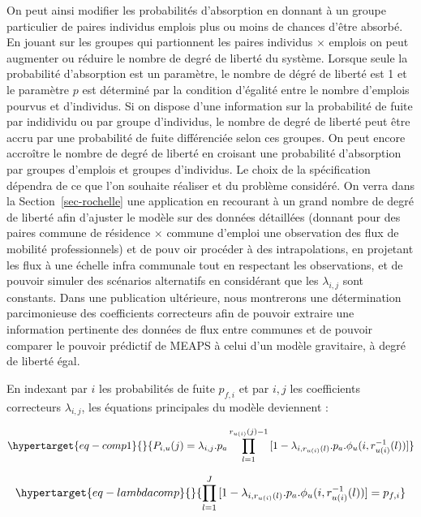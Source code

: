 \documentclass[
  10pt,
  a4paper,
  numbers=noendperiod,
  DIV=12]{scrartcl}
\begin{document}
On peut ainsi modifier les probabilités d'absorption en donnant à un
groupe particulier de paires individus emplois plus ou moins de chances
d'être absorbé. En jouant sur les groupes qui partionnent les paires
individus \(\times\) emplois on peut augmenter ou réduire le nombre de
degré de liberté du système. Lorsque seule la probabilité d'absorption
est un paramètre, le nombre de dégré de liberté est 1 et le paramètre
\(p\) est déterminé par la condition d'égalité entre le nombre d'emplois
pourvus et d'individus. Si on dispose d'une information sur la
probabilité de fuite par indidividu ou par groupe d'individus, le nombre
de degré de liberté peut être accru par une probabilité de fuite
différenciée selon ces groupes. On peut encore accroître le nombre de
degré de liberté en croisant une probabilité d'absorption par groupes
d'emplois et groupes d'individus. Le choix de la spécification dépendra
de ce que l'on souhaite réaliser et du problème considéré. On verra dans
la Section~\ref{sec-rochelle} une application en recourant à un grand
nombre de degré de liberté afin d'ajuster le modèle sur des données
détaillées (donnant pour des paires commune de résidence \(\times\)
commune d'emploi une observation des flux de mobilité professionnels) et
de pouv oir procéder à des intrapolations, en projetant les flux à une
échelle infra communale tout en respectant les observations, et de
pouvoir simuler des scénarios alternatifs en considérant que les
\(\lambda_{i,j}\) sont constants. Dans une publication ultérieure, nous
montrerons une détermination parcimonieuse des coefficients correcteurs
afin de pouvoir extraire une information pertinente des données de flux
entre communes et de pouvoir comparer le pouvoir prédictif de MEAPS à
celui d'un modèle gravitaire, à degré de liberté égal.

En indexant par \(i\) les probabilités de fuite \(p_{f,i}\) et par
\(i,j\) les coefficients correcteurs \(\lambda_{i,j}\), les équations
principales du modèle deviennent :

\begin{equation}\protect\hypertarget{eq-comp1}{}{
P_{i, u}(j) = \lambda_{i,j} . p_{a} \prod _{l=1} ^{r_{u(i)}(j)-1} {[1-\lambda_{i,r_{u(i)}(l)}. p_{a}.\phi_u(i,r_{u(i)}^{-1}(l))]}
}\label{eq-comp1}\end{equation}

\begin{equation}\protect\hypertarget{eq-lambdacomp}{}{
\prod _{l=1} ^{J} {[1-\lambda_{i,r_{u(i)}(l)}.p_{a}.\phi_u(i,r_{u(i)}^{-1}(l))]}= p_{f,i}
}\label{eq-lambdacomp}\end{equation}
\end{document}
